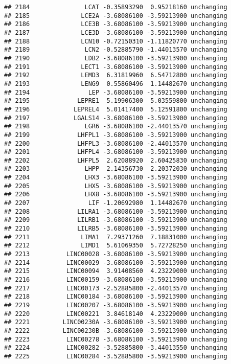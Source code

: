 \documentclass[]{article}
\begin{document}
\begin{verbatim}
## 2184               LCAT -0.35893290  0.95218160 unchanging
## 2185              LCE2A -3.68086100 -3.59213900 unchanging
## 2186              LCE3B -3.68086100 -3.59213900 unchanging
## 2187              LCE3D -3.68086100 -3.59213900 unchanging
## 2188              LCN10 -0.72150310 -1.11820770 unchanging
## 2189               LCN2 -0.52885790 -1.44013570 unchanging
## 2190               LDB2 -3.68086100 -3.59213900 unchanging
## 2191              LECT1 -3.68086100 -3.59213900 unchanging
## 2192              LEMD3  6.31819960  6.54712800 unchanging
## 2193              LENG9  0.55860496  1.14482670 unchanging
## 2194                LEP -3.68086100 -3.59213900 unchanging
## 2195             LEPRE1  5.19906300  5.03559800 unchanging
## 2196            LEPREL4  5.01417400  5.12591800 unchanging
## 2197            LGALS14 -3.68086100 -3.59213900 unchanging
## 2198               LGR6 -3.68086100 -2.44013570 unchanging
## 2199             LHFPL1 -3.68086100 -3.59213900 unchanging
## 2200             LHFPL3 -3.68086100 -2.44013570 unchanging
## 2201             LHFPL4 -3.68086100 -3.59213900 unchanging
## 2202             LHFPL5  2.62088920  2.60425830 unchanging
## 2203               LHPP  2.14356730  2.20372030 unchanging
## 2204               LHX3 -3.68086100 -3.59213900 unchanging
## 2205               LHX5 -3.68086100 -3.59213900 unchanging
## 2206               LHX8 -3.68086100 -3.59213900 unchanging
## 2207                LIF -1.20692980  1.14482670 unchanging
## 2208             LILRA1 -3.68086100 -3.59213900 unchanging
## 2209             LILRB1 -3.68086100 -3.59213900 unchanging
## 2210             LILRB5 -3.68086100 -3.59213900 unchanging
## 2211              LIMA1  7.29371260  7.18831000 unchanging
## 2212              LIMD1  5.61069350  5.72728250 unchanging
## 2213          LINC00028 -3.68086100 -3.59213900 unchanging
## 2214          LINC00029 -3.68086100 -3.59213900 unchanging
## 2215          LINC00094  3.91408560  4.23229000 unchanging
## 2216          LINC00159 -3.68086100 -3.59213900 unchanging
## 2217          LINC00173 -2.52885800 -2.44013570 unchanging
## 2218          LINC00184 -3.68086100 -3.59213900 unchanging
## 2219          LINC00207 -3.68086100 -3.59213900 unchanging
## 2220          LINC00221  3.84618140  4.23229000 unchanging
## 2221         LINC00230A -3.68086100 -3.59213900 unchanging
## 2222         LINC00230B -3.68086100 -3.59213900 unchanging
## 2223          LINC00278 -3.68086100 -3.59213900 unchanging
## 2224          LINC00282 -3.52885800 -3.44013550 unchanging
## 2225          LINC00284 -3.52885800 -3.59213900 unchanging

\end{verbatim}
\end{document}
